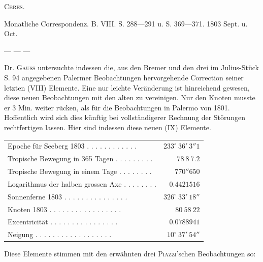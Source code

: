 \begin{flushright}
\end{flushright}

\bigskip
{}
\centerline{\textsc{Ceres.}}

\medskip
Monatliche Correspondenz. B. VIII. S. 288---291 u. S. 369---371. 1803 Sept. u. Oct.

\medskip
— — —

\medskip
Dr. \textsc{Gauss} untersuchte indessen die, aus den Bremer und den drei im Julius-Stück S. 94 angegebenen Palermer Beobachtungen hervorgehende Correction seiner letzten (VIII) Elemente. Eine nur leichte Veränderung ist hinreichend gewesen, diese neuen Beobachtungen mit den alten zu vereinigen. Nur den Knoten musste er 3 Min. weiter rücken, als für die Beobachtungen in Palermo von 1801. Hoffentlich wird sich dies künftig bei vollständigerer Rechnung der Störungen rechtfertigen lassen. Hier sind indessen diese neuen (IX) Elemente.

\begin{center}
\begingroup\fontsize{9}{11}\selectfont\setlength{\tabcolsep}{3pt}
\begin{tabular}{lr}
Epoche für Seeberg 1803 . . . . . . . . . . . . & $233^\circ\ 36'\ 3''1$ \\
Tropische Bewegung in 365 Tagen . . . . . . . . . & $78\ 8\ 7.2$ \\
Tropische Bewegung in einem Tage . . . . . . . . & $770''650$ \\
Logarithmus der halben grossen Axe . . . . . . . . & $0.4421516$ \\
Sonnenferne 1803 . . . . . . . . . . . . . . . & $326^\circ\ 33'\ 18''$ \\
Knoten 1803 . . . . . . . . . . . . . . . . . & $80\ 58\ 22$ \\
Excentricität . . . . . . . . . . . . . . . . & $0.0788941$ \\
Neigung . . . . . . . . . . . . . . . . . . & $10^\circ\ 37'\ 54''$ \\
\end{tabular}\endgroup
\end{center}
%

Diese Elemente stimmen mit den erwähnten drei \textsc{Piazzi}'schen Beobachtungen so:

